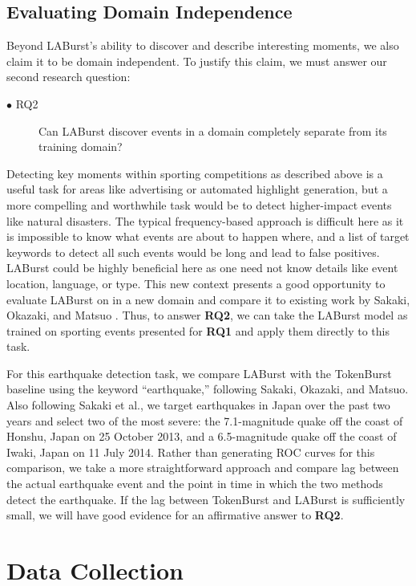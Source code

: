 \documentclass[letterpaper]{article}
\begin{document}
\subsection{Evaluating Domain Independence}

Beyond LABurst's ability to discover and describe interesting moments, we also claim it to be domain independent.
To justify this claim, we must answer our second research question:
\begin{description}
\item[$\bullet$ RQ2] Can LABurst discover events in a domain completely separate from its training domain?
\end{description}

Detecting key moments within sporting competitions as described above is a useful task for areas like advertising or automated highlight generation, but a more compelling and worthwhile task would be to detect higher-impact events like natural disasters.
The typical frequency-based approach is difficult here as it is impossible to know what events are about to happen where, and a list of target keywords to detect all such events would be long and lead to false positives.
LABurst could be highly beneficial here as one need not know details like event location, language, or type.
This new context presents a good opportunity to evaluate LABurst on in a new domain and compare it to existing work by Sakaki, Okazaki, and Matsuo \cite{Sakaki:2010:EST:1772690.1772777}.
Thus, to answer \textbf{RQ2}, we can take the LABurst model as trained on sporting events presented for \textbf{RQ1} and apply them directly to this task.

For this earthquake detection task, we compare LABurst with the TokenBurst baseline using the keyword ``earthquake,'' following Sakaki, Okazaki, and Matsuo.
Also following Sakaki et al., we target earthquakes in Japan over the past two years and select two of the most severe: the 7.1-magnitude quake off the coast of Honshu, Japan on 25 October 2013, and a 6.5-magnitude quake off the coast of Iwaki, Japan on 11 July 2014.
Rather than generating ROC curves for this comparison, we take a more straightforward approach and compare lag between the actual earthquake event and the point in time in which the two methods detect the earthquake.
If the lag between TokenBurst and LABurst is sufficiently small, we will have good evidence for an affirmative answer to \textbf{RQ2}.

\section{Data Collection}
\end{document}

